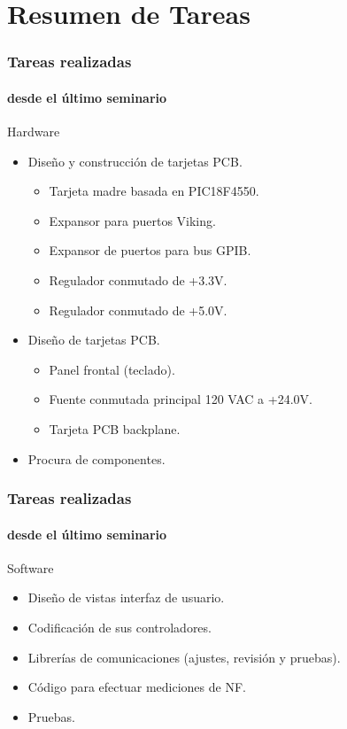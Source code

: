 \documentclass[xcolor=pdftext, table]{beamer}
\begin{document}
	\section{Resumen de Tareas}
	
		
		\begin{frame}	
			\frametitle{Tareas realizadas}			
			\framesubtitle{desde el último seminario}
			
			\begin{block}{Hardware}					
				\small
				\begin{itemize}
					\item Diseño y construcción de tarjetas PCB.	\\
					\begin{itemize}						
						\item Tarjeta madre basada en PIC18F4550.
						\item Expansor para puertos Viking.
						\item Expansor de puertos para bus GPIB.
						\item Regulador conmutado de +3.3V.
						\item Regulador conmutado de +5.0V.					
					\end{itemize}
					\item Diseño de tarjetas PCB.
					\begin{itemize}
						\item Panel frontal (teclado).
						\item Fuente conmutada principal 120 VAC a +24.0V.
						\item Tarjeta PCB backplane.
					\end{itemize}
					\item Procura de componentes.
				\end{itemize}	
			\end{block}	
					
		\end{frame}
		
		
		\begin{frame}
			\frametitle{Tareas realizadas}
			\framesubtitle{desde el último seminario}
			\begin{block}{Software}
				\small
				\begin{itemize}									
					\item Diseño de vistas interfaz de usuario.
					\item Codificación de sus controladores.
					\item Librerías de comunicaciones (ajustes, revisión y pruebas).
					\item Código para efectuar mediciones de NF.
					\item Pruebas.
				\end{itemize}
			\end{block}			
		\end{frame}
		
\end{document}
